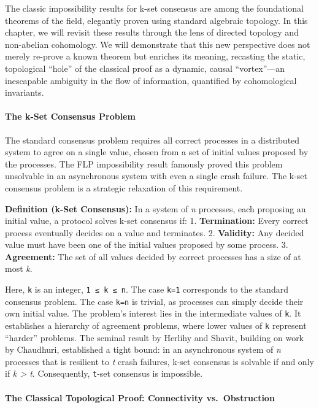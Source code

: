 \documentclass[
]{article}
\begin{document}
The classic impossibility results for k-set consensus are among the
foundational theorems of the field, elegantly proven using standard
algebraic topology. In this chapter, we will revisit these results
through the lens of directed topology and non-abelian cohomology. We
will demonstrate that this new perspective does not merely re-prove a
known theorem but enriches its meaning, recasting the static,
topological ``hole'' of the classical proof as a dynamic, causal
``vortex''---an inescapable ambiguity in the flow of information,
quantified by cohomological invariants.

\paragraph{The k-Set Consensus
Problem}\label{the-k-set-consensus-problem}

The standard consensus problem requires all correct processes in a
distributed system to agree on a single value, chosen from a set of
initial values proposed by the processes. The FLP impossibility result
famously proved this problem unsolvable in an asynchronous system with
even a single crash failure. The k-set consensus problem is a strategic
relaxation of this requirement.

\textbf{Definition (k-Set Consensus):} In a system of \emph{n}
processes, each proposing an initial value, a protocol solves k-set
consensus if: 1. \textbf{Termination:} Every correct process eventually
decides on a value and terminates. 2. \textbf{Validity:} Any decided
value must have been one of the initial values proposed by some process.
3. \textbf{Agreement:} The set of all values decided by correct
processes has a size of at most \emph{k}.

Here, \texttt{k} is an integer, \texttt{1\ ≤\ k\ ≤\ n}. The case
\texttt{k=1} corresponds to the standard consensus problem. The case
\texttt{k=n} is trivial, as processes can simply decide their own
initial value. The problem's interest lies in the intermediate values of
\texttt{k}. It establishes a hierarchy of agreement problems, where
lower values of \texttt{k} represent ``harder'' problems. The seminal
result by Herlihy and Shavit, building on work by Chaudhuri, established
a tight bound: in an asynchronous system of \emph{n} processes that is
resilient to \emph{t} crash failures, k-set consensus is solvable if and
only if \emph{k \textgreater{} t}. Consequently, \texttt{t}-set
consensus is impossible.

\paragraph{The Classical Topological Proof: Connectivity
vs.~Obstruction}\label{the-classical-topological-proof-connectivity-vs.-obstruction}
\end{document}
